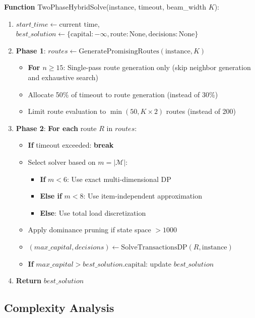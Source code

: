 \documentclass[12pt]{article}
\begin{document}
\textbf{Function} TwoPhaseHybridSolve(instance, timeout, beam\_width $K$):
\begin{enumerate}
    \item $start\_time \gets \text{current time}$, $best\_solution \gets \{\text{capital}: -\infty, \text{route}: \text{None}, \text{decisions}: \text{None}\}$
    \item \textbf{Phase 1}: $routes \gets \text{GeneratePromisingRoutes}(\text{instance}, K)$
    \begin{itemize}
        \item \textbf{For $n \geq 15$}: Single-pass route generation only (skip neighbor generation and exhaustive search)
        \item Allocate 50\% of timeout to route generation (instead of 30\%)
        \item Limit route evaluation to $\min(50, K \times 2)$ routes (instead of 200)
    \end{itemize}
    \item \textbf{Phase 2}: \textbf{For each} route $R$ in $routes$:
    \begin{itemize}
        \item \textbf{If} timeout exceeded: \textbf{break}
        \item Select solver based on $m = |\mathcal{M}|$:
        \begin{itemize}
            \item \textbf{If} $m < 6$: Use exact multi-dimensional DP
            \item \textbf{Else if} $m < 8$: Use item-independent approximation
            \item \textbf{Else}: Use total load discretization
        \end{itemize}
        \item Apply dominance pruning if state space $> 1000$
        \item $(max\_capital, decisions) \gets \text{SolveTransactionsDP}(R, \text{instance})$
        \item \textbf{If} $max\_capital > best\_solution.\text{capital}$: update $best\_solution$
    \end{itemize}
    \item \textbf{Return} $best\_solution$
\end{enumerate}

\subsection{Complexity Analysis}
\end{document}
